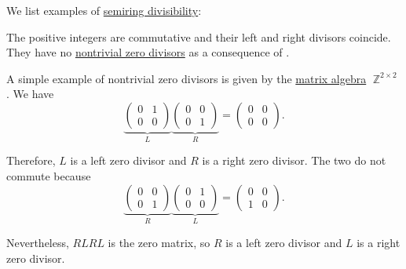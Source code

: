 \begin{example}\label{ex:def:divisibility}
  We list examples of \hyperref[def:divisibility]{semiring divisibility}:
  \begin{thmenum}
     The positive integers are commutative and their left and right divisors coincide. They have no \hyperref[def:divisibility/zero]{nontrivial zero divisors} as a consequence of .

     A simple example of nontrivial zero divisors is given by the \hyperref[thm:matrix_algebra]{matrix algebra} \( \BbbZ^{2 \times 2} \). We have
    \begin{equation*}
      \underbrace
      {
        \begin{pmatrix}
          0 & 1 \\
          0 & 0
        \end{pmatrix}
      }_{L}
      \underbrace
      {
        \begin{pmatrix}
          0 & 0 \\
          0 & 1
        \end{pmatrix}
      }_{R}
      =
      \begin{pmatrix}
        0 & 0 \\
        0 & 0
      \end{pmatrix}.
    \end{equation*}

    Therefore, \( L \) is a left zero divisor and \( R \) is a right zero divisor. The two do not commute because
    \begin{equation*}
      \underbrace
      {
        \begin{pmatrix}
          0 & 0 \\
          0 & 1
        \end{pmatrix}
      }_{R}
      \underbrace
      {
        \begin{pmatrix}
          0 & 1 \\
          0 & 0
        \end{pmatrix}
      }_{L}
      =
      \begin{pmatrix}
        0 & 0 \\
        1 & 0
      \end{pmatrix}.
    \end{equation*}

    Nevertheless, \( RLRL \) is the zero matrix, so \( R \) is a left zero divisor and \( L \) is a right zero divisor.
  \end{thmenum}
\end{example}


